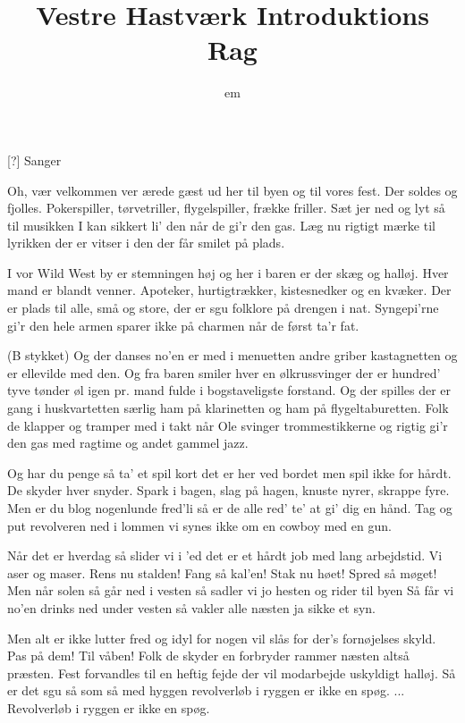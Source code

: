 \documentclass[a4paper,11pt]{article}
\title{Vestre Hastværk Introduktions Rag}
\author{em}
\begin{document}
\maketitle

\begin{roles}
  [?] Sanger
\end{roles}

\begin{song}
  Oh, vær velkommen ver ærede gæst
  ud her til byen og til vores fest.
  Der soldes
  og fjolles.
  Pokerspiller,
  tørvetriller,
  flygelspiller,
  frække friller.
  Sæt jer ned og lyt så til musikken
  I kan sikkert li' den
  når de gi'r den gas.
  Læg nu rigtigt mærke til lyrikken
  der er vitser i den
  der får smilet på plads.

  I vor Wild West by er stemningen høj
  og her i baren er der skæg og halløj.
  Hver mand er
  blandt venner.
  Apoteker,
  hurtigtrækker,
  kistesnedker
  og en kvæker.
  Der er plads til alle, små og store,
  der er sgu folklore
  på drengen i nat.
  Syngepi'rne gi'r den hele armen
  sparer ikke på charmen
  når de først ta'r fat.

  (B stykket)
  Og der danses
  no'en er med i menuetten
  andre griber kastagnetten
  og er ellevilde med den.
  Og fra baren
  smiler hver en ølkrussvinger
  der er hundred' tyve tønder øl igen pr. mand
  fulde i bogstaveligste forstand.
  Og der spilles
  der er gang i huskvartetten
  særlig ham på klarinetten
  og ham på flygeltaburetten.
  Folk de klapper
  og tramper med i takt når Ole
  svinger trommestikkerne og rigtig gi'r den gas
  med ragtime og andet gammel jazz.

  Og har du penge så ta' et spil kort
  det er her ved bordet men spil ikke for hårdt.
  De skyder
  hver snyder.
  Spark i bagen,
  slag på hagen,
  knuste nyrer,
  skrappe fyre.
  Men er du blog nogenlunde fred'li
  så er de alle red' te'
  at gi' dig en hånd.
  Tag og put revolveren ned i lommen
  vi synes ikke om en
  cowboy med en gun.

  Når det er hverdag så slider vi i 'ed
  det er et hårdt job med lang arbejdstid.
  Vi aser
  og maser.
  Rens nu stalden!
  Fang så kal'en!
  Stak nu høet!
  Spred så møget!
  Men når solen så går ned i vesten
  så sadler vi jo hesten
  og rider til byen
  Så får vi no'en drinks ned under vesten
  så vakler alle næsten
  ja sikke et syn.

Men alt er ikke lutter fred og idyl
for nogen vil slås for der's fornøjelses skyld.
Pas på dem!
Til våben!
Folk de skyder
en forbryder
rammer næsten
altså præsten.
Fest forvandles til en heftig fejde
der vil modarbejde
uskyldigt halløj.
Så er det sgu så som så med hyggen
revolverløb i ryggen
er ikke en spøg.
...
Revolverløb i ryggen
er ikke en spøg.
\end{song}
\end{document}
